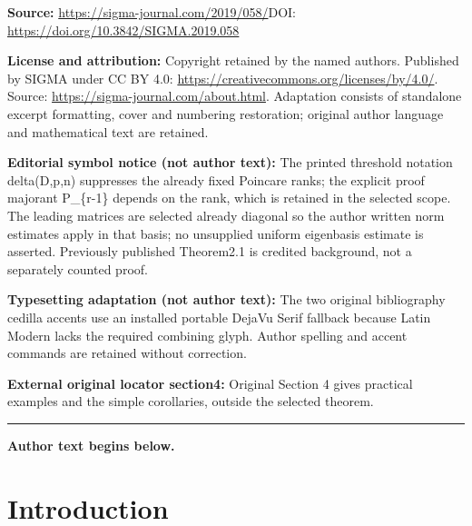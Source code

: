 \documentclass[11pt]{article}
\numberwithin{equation}{section}
\begin{document}
\noindent\textbf{Source:} \url{https://sigma-journal.com/2019/058/}\quad DOI: \url{https://doi.org/10.3842/SIGMA.2019.058}\par
\noindent\textbf{License and attribution:} Copyright retained by the named authors. Published by SIGMA under CC BY 4.0: \url{https://creativecommons.org/licenses/by/4.0/}. Source: \url{https://sigma-journal.com/about.html}. Adaptation consists of standalone excerpt formatting, cover and numbering restoration; original author language and mathematical text are retained.\par
\noindent\textbf{Editorial symbol notice (not author text):} The printed threshold notation delta(D,p,n) suppresses the already fixed Poincare ranks; the explicit proof majorant P\_\{r-1\} depends on the rank, which is retained in the selected scope. The leading matrices are selected already diagonal so the author written norm estimates apply in that basis; no unsupplied uniform eigenbasis estimate is asserted. Previously published Theorem2.1 is credited background, not a separately counted proof.\par
\noindent\textbf{Typesetting adaptation (not author text):} The two original bibliography cedilla accents use an installed portable DejaVu Serif fallback because Latin Modern lacks the required combining glyph. Author spelling and accent commands are retained without correction.\par
\noindent\textbf{External original locator section4:} Original Section 4 gives practical examples and the simple corollaries, outside the selected theorem.\par
\medskip\hrule\medskip\noindent\textbf{Author text begins below.}\par
\setcounter{section}{0}
\setcounter{subsection}{0}
\setcounter{subsubsection}{0}
\setcounter{Theorem}{0}
\setcounter{equation}{0}
\section{Introduction}
\end{document}

